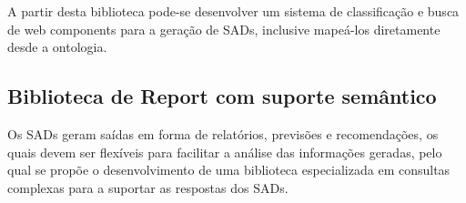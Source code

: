 A partir desta biblioteca pode-se desenvolver um sistema de classificação
e busca de \foreignlanguage{english}{web components} para a geração
de SADs, inclusive mapeá-los diretamente desde a ontologia.

\subsection*{Biblioteca de \foreignlanguage{english}{Report} com suporte semântico}

Os SADs geram saídas em forma de relatórios, previsões e recomendações,
os quais devem ser flexíveis para facilitar a análise das informações
geradas, pelo qual se propõe o desenvolvimento de uma biblioteca especializada
em consultas complexas para a suportar as respostas dos SADs.

